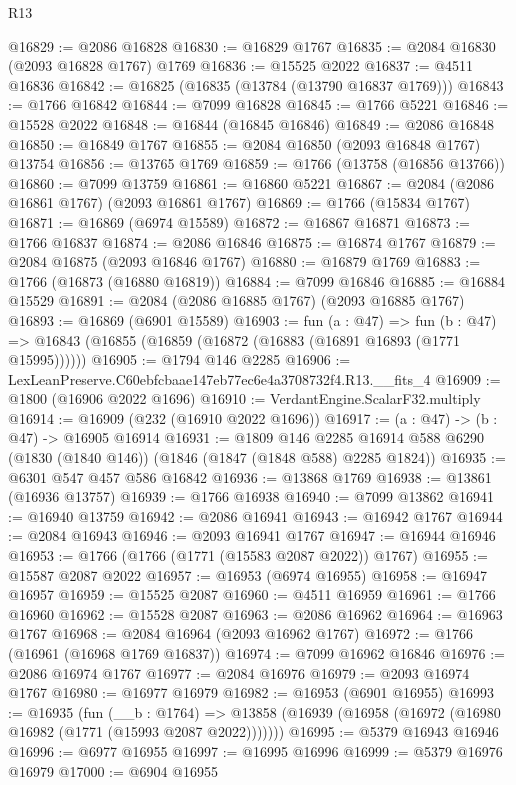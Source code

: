 \begin{lexlean}{R13}
\begin{coremodule}
@16829 := @2086 @16828
@16830 := @16829 @1767
@16835 := @2084 @16830 (@2093 @16828 @1767) @1769
@16836 := @15525 @2022
@16837 := @4511 @16836
@16842 := @16825 (@16835 (@13784 (@13790 @16837 @1769)))
@16843 := @1766 @16842
@16844 := @7099 @16828
@16845 := @1766 @5221
@16846 := @15528 @2022
@16848 := @16844 (@16845 @16846)
@16849 := @2086 @16848
@16850 := @16849 @1767
@16855 := @2084 @16850 (@2093 @16848 @1767) @13754
@16856 := @13765 @1769
@16859 := @1766 (@13758 (@16856 @13766))
@16860 := @7099 @13759
@16861 := @16860 @5221
@16867 := @2084 (@2086 @16861 @1767) (@2093 @16861 @1767)
@16869 := @1766 (@15834 @1767)
@16871 := @16869 (@6974 @15589)
@16872 := @16867 @16871
@16873 := @1766 @16837
@16874 := @2086 @16846
@16875 := @16874 @1767
@16879 := @2084 @16875 (@2093 @16846 @1767)
@16880 := @16879 @1769
@16883 := @1766 (@16873 (@16880 @16819))
@16884 := @7099 @16846
@16885 := @16884 @15529
@16891 := @2084 (@2086 @16885 @1767) (@2093 @16885 @1767)
@16893 := @16869 (@6901 @15589)
@16903 := fun (a : @47) =>
  fun (b : @47) => @16843 (@16855 (@16859 (@16872 (@16883 (@16891 @16893 (@1771 @15995))))))
@16905 := @1794 @146 @2285
@16906 := LexLeanPreserve.C60ebfcbaae147eb77ec6e4a3708732f4.R13.__fits_4
@16909 := @1800 (@16906 @2022 @1696)
@16910 := VerdantEngine.ScalarF32.multiply
@16914 := @16909 (@232 (@16910 @2022 @1696))
@16917 := (a : @47) -> (b : @47) -> @16905 @16914
@16931 := @1809
    @146
    @2285
    @16914
    @588
    @6290
    (@1830 (@1840 @146))
    (@1846 (@1847 (@1848 @588) @2285 @1824))
@16935 := @6301 @547 @457 @586 @16842
@16936 := @13868 @1769
@16938 := @13861 (@16936 @13757)
@16939 := @1766 @16938
@16940 := @7099 @13862
@16941 := @16940 @13759
@16942 := @2086 @16941
@16943 := @16942 @1767
@16944 := @2084 @16943
@16946 := @2093 @16941 @1767
@16947 := @16944 @16946
@16953 := @1766 (@1766 (@1771 (@15583 @2087 @2022)) @1767)
@16955 := @15587 @2087 @2022
@16957 := @16953 (@6974 @16955)
@16958 := @16947 @16957
@16959 := @15525 @2087
@16960 := @4511 @16959
@16961 := @1766 @16960
@16962 := @15528 @2087
@16963 := @2086 @16962
@16964 := @16963 @1767
@16968 := @2084 @16964 (@2093 @16962 @1767)
@16972 := @1766 (@16961 (@16968 @1769 @16837))
@16974 := @7099 @16962 @16846
@16976 := @2086 @16974 @1767
@16977 := @2084 @16976
@16979 := @2093 @16974 @1767
@16980 := @16977 @16979
@16982 := @16953 (@6901 @16955)
@16993 := @16935
    (fun (__b : @1764) =>
    @13858 (@16939 (@16958 (@16972 (@16980 @16982 (@1771 (@15993 @2087 @2022)))))))
@16995 := @5379 @16943 @16946
@16996 := @6977 @16955
@16997 := @16995 @16996
@16999 := @5379 @16976 @16979
@17000 := @6904 @16955

\end{coremodule}
\end{lexlean}
